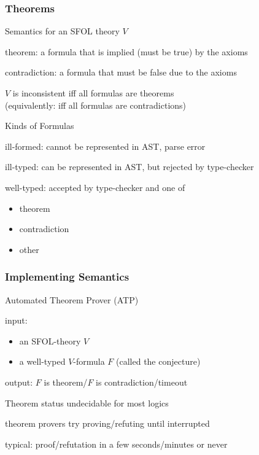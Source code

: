 \begin{frame}\frametitle{Theorems}
\begin{blockitems}{Semantics for an SFOL theory $V$}
\item theorem: a formula that is implied (must be true) by the axioms
\item contradiction: a formula that must be false due to the axioms
\item $V$ is inconsistent iff all formulas are theorems \\ (equivalently: iff all formulas are contradictions)
\end{blockitems}

\begin{blockitems}{Kinds of Formulas}
\item ill-formed: cannot be represented in AST, parse error
\item ill-typed: can be represented in AST, but rejected by type-checker
\item well-typed: accepted by type-checker and one of
\begin{itemize}
\item theorem
\item contradiction
\item other
\end{itemize}
\end{blockitems}
\end{frame}

\begin{frame}\frametitle{Implementing Semantics}
\begin{blockitems}{Automated Theorem Prover (ATP)}
\item input:
 \begin{itemize}
 \item an SFOL-theory $V$
 \item a well-typed $V$-formula $F$ (called the conjecture)
 \end{itemize}
\item output: $F$ is theorem/$F$ is contradiction/timeout
\end{blockitems}

\begin{blockitems}{Theorem status undecidable for most logics}
\item theorem provers try proving/refuting until interrupted
\item typical: proof/refutation in a few seconds/minutes or never
\end{blockitems}

\end{frame}

